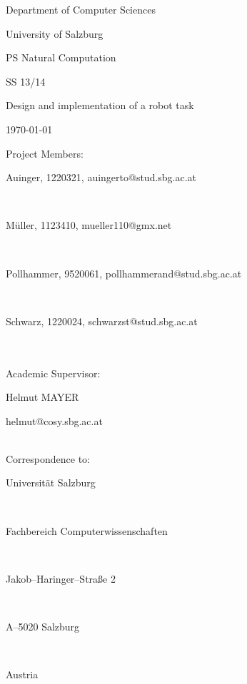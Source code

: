 \documentclass[12pt,fleqn,a4paper]{article}
\begin{document}
\begin{titlepage}%
\vspace{2cm}
\centerline{
\large{Department of Computer Sciences}}
\vspace{0.2cm}
\centerline{\large{University of Salzburg}}%
\vspace{2cm}

\centerline{\large{PS Natural Computation}}
\centerline{SS 13/14}
\vspace{1cm}

\centerline{\Large{Design and implementation of a robot task}}
\vspace{1cm}

\vspace{0.4cm}%
\centerline{\today}
\vspace{5cm}%

\vspace{0.2cm}
Project Members:\\
\centerline{Auinger, 1220321, auingerto@stud.sbg.ac.at}\\
\centerline{M\"{u}ller, 1123410, mueller110@gmx.net}\\
\centerline{Pollhammer, 9520061, pollhammerand@stud.sbg.ac.at}\\
\centerline{Schwarz, 1220024, schwarzst@stud.sbg.ac.at}\\
\vspace {0.8cm}\\

Academic Supervisor: \\
\centerline{Helmut MAYER}
\centerline{helmut@cosy.sbg.ac.at}
\vspace{0.8cm}\\
Correspondence to: \\
\centerline{Universit\"{a}t Salzburg} \\
\centerline{Fachbereich Computerwissenschaften} \\
\centerline{Jakob--Haringer--Stra\ss e 2} \\
\centerline{A--5020 Salzburg} \\
\centerline{Austria}
\clearpage
\end{titlepage}



\end{document}
